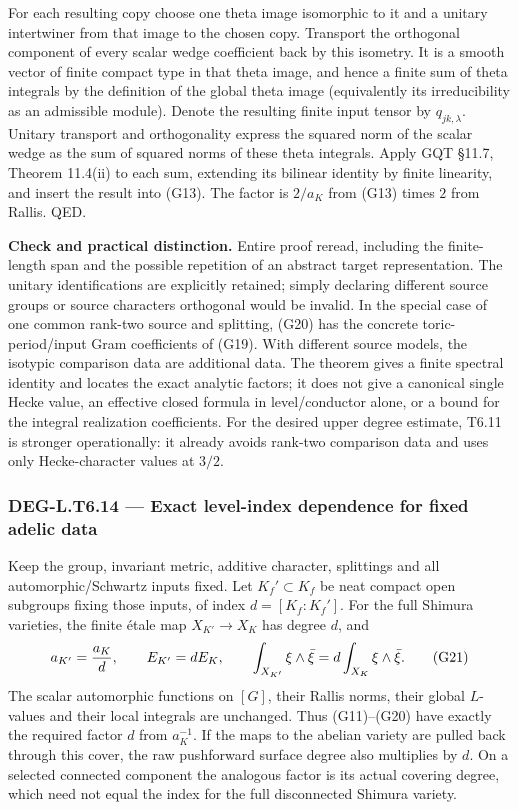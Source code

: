\documentclass[11pt,a4paper]{article}
\theoremstyle{definition}
\begin{document}
For each resulting copy choose one theta image isomorphic to it and a unitary intertwiner from that image to the chosen copy. Transport the orthogonal component of every scalar wedge coefficient back by this isometry. It is a smooth vector of finite compact type in that theta image, and hence a finite sum of theta integrals by the definition of the global theta image (equivalently its irreducibility as an admissible module). Denote the resulting finite input tensor by \(q_{jk,\lambda}\). Unitary transport and orthogonality express the squared norm of the scalar wedge as the sum of squared norms of these theta integrals. Apply GQT §11.7, Theorem 11.4(ii) to each sum, extending its bilinear identity by finite linearity, and insert the result into (G13). The factor is \(2/a_K\) from (G13) times \(2\) from Rallis. QED.

\textbf{Check and practical distinction.} Entire proof reread, including the finite-length span and the possible repetition of an abstract target representation. The unitary identifications are explicitly retained; simply declaring different source groups or source characters orthogonal would be invalid. In the special case of one common rank-two source and splitting, (G20) has the concrete toric-period/input Gram coefficients of (G19). With different source models, the isotypic comparison data are additional data. The theorem gives a finite spectral identity and locates the exact analytic factors; it does not give a canonical single Hecke value, an effective closed formula in level/conductor alone, or a bound for the integral realization coefficients. For the desired upper degree estimate, T6.11 is stronger operationally: it already avoids rank-two comparison data and uses only Hecke-character values at \(3/2\).

\subsubsection{DEG-L.T6.14 --- Exact level-index dependence for fixed adelic data}\label{DEG-L.T6.14}

Keep the group, invariant metric, additive character, splittings and all automorphic/Schwartz inputs fixed. Let \(K_f'\subset K_f\) be neat compact open subgroups fixing those inputs, of index \(d=[K_f:K_f']\). For the full Shimura varieties, the finite étale map \(X_{K'}\to X_K\) has degree \(d\), and \[
a_{K'}={a_K\over d},\qquad
E_{K'}=dE_K,\qquad
\int_{X_{K'}}\xi\wedge\bar\xi
=d\int_{X_K}\xi\wedge\bar\xi.
\tag{G21}
\] The scalar automorphic functions on \([G]\), their Rallis norms, their global \(L\)-values and their local integrals are unchanged. Thus (G11)--(G20) have exactly the required factor \(d\) from \(a_K^{-1}\). If the maps to the abelian variety are pulled back through this cover, the raw pushforward surface degree also multiplies by \(d\). On a selected connected component the analogous factor is its actual covering degree, which need not equal the index for the full disconnected Shimura variety.
\end{document}
